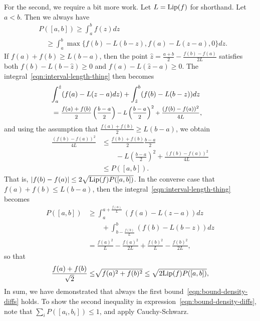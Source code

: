For the second, we require a bit more work.
Let $L = {\rm \textup{Lip}}(f)$ for shorthand. Let $a < b$.
Then we always have
\begin{align}
  \label{eqn:interval-length-thing}
  & P([a, b]) \ge \int_a^b f(z) dz \\
  & \quad \ge \int_a^b \max\{f(b) - L (b - z), f(a) - L(z - a), 0\} dz. \nonumber
\end{align}
If $f(a) + f(b) \ge L (b - a)$, then the point $\hat{z} =
\frac{a + b}{2} - \frac{f(b) - f(a)}{2L}$ satisfies both $f(b) - L(b -
\hat{z}) \ge 0$ and $f(a) - L(\hat{z} - a) \ge 0$. The
integral~\eqref{eqn:interval-length-thing} then becomes
\begin{align*}
  \lefteqn{\int_a^{\hat{z}}
    (f(a) - L (z - a) dz)
    + \int_{\hat{z}}^b
    (f(b) - L (b - z)) dz} \\
  & = \medmath{\frac{f(a) + f(b)}{2}
  \left(\frac{b - a}{2}\right)
  - L \left(\frac{b - a}{2} \right)^2
  + \frac{(f(b) - f(a))^2}{4L}},
\end{align*}
and using the assumption that $\frac{f(a) + f(b)}{2} \ge L(b - a)$,
we obtain
\begin{align*}
  \frac{(f(b) - f(a))^2}{4L}
  & \le \frac{f(b) + f(b)}{2} \frac{b - a}{2} \\
  & \qquad - L \left(\frac{b - a}{2}\right)^2
  + \frac{(f(b) - f(a))^2}{4L} \\
  & \le P([a, b]).
\end{align*}
That is, $|f(b) - f(a)| \le 2 \sqrt{{\rm \textup{Lip}}(f) P([a, b])}$.
In the converse case that $f(a) + f(b) \le L(b - a)$, then
the integral~\eqref{eqn:interval-length-thing} becomes
\begin{align*}
  P([a, b])
  & \ge \int_a^{a + \frac{f(a)}{L}}
  (f(a) - L (z - a)) dz \\
  & \qquad + \int_{b - \frac{f(b)}{L}}^b (f(b) - L (b - z)) dz \\
  & = \frac{f(a)^2}{L}
  - \frac{f(a)^2}{2L}
  + \frac{f(b)^2}{L}
  - \frac{f(b)^2}{2L},
\end{align*}
so that 
\begin{align*}
{\color{black} {\frac{f(a) + f(b)}{\sqrt{2}} \le}} \sqrt{f(a)^2 + f(b)^2} \le \sqrt{2 {\rm \textup{Lip}}(f) P([a, b])},
\end{align*}
 In sum, we have demonstrated that always the first
bound~\eqref{eqn:bound-density-diffs} holds.
To show the second inequality in expression~\eqref{eqn:bound-density-diffs},
note that
$\sum_i P([a_i, b_i]) \le 1$, and apply Cauchy-Schwarz.

